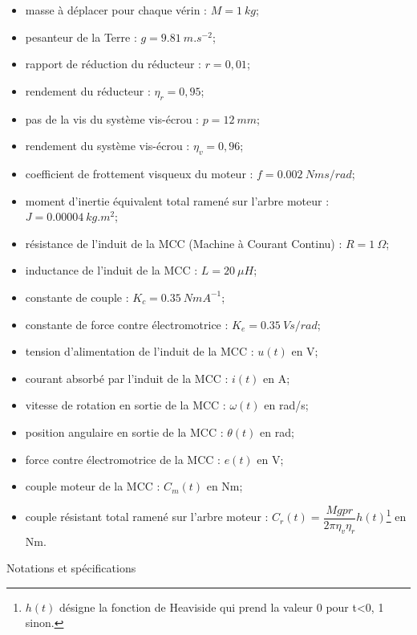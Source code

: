 \begin{table*}[!h]
\begin{multicols}{3}
\begin{itemize}
\item masse à déplacer pour chaque vérin : $M =\SI{1}{kg}$;
\item pesanteur de la Terre : $g = \SI{9,81}{m.s^{-2}}$;
\item rapport de réduction du réducteur : $r = 0,01$;
\item rendement du réducteur : $\eta_r = 0,95$;
\item pas de la vis du système vis-écrou : $p = \SI{12}{mm}$;
\item rendement du système vis-écrou : $\eta_v = 0,96$;
\item coefficient de frottement visqueux du moteur : $f=\SI{0,002}{Nms/rad}$;
\item moment d’inertie équivalent total ramené sur l’arbre moteur : $J = \SI{0,00004}{kg.m^2}$;
\item résistance de l’induit de la MCC (Machine à Courant Continu) : $R =\SI{1}{\Omega}$;
\item inductance de l’induit de la MCC : $L = \SI{20}{\mu H}$;
\item constante de couple : $K_c = \SI{0,35}{NmA^{-1}}$;
\item constante de force contre électromotrice : $K_e = \SI{0,35}{Vs/rad}$;
\item tension d’alimentation de l’induit de la MCC : $u(t)$ en \si{V};
\item courant absorbé par l’induit de la MCC : $i(t)$ en \si{A};
\item vitesse de rotation en sortie de la MCC : $\omega(t)$ en \si{rad/s};
\item position angulaire en sortie de la MCC :  $\theta(t)$ en \si{rad};
\item force contre électromotrice de la MCC : $e(t)$ en \si{V};
\item couple moteur de la MCC : $C_m(t)$ en \si{Nm};
\item couple résistant total ramené sur l’arbre moteur : $C_r(t) = \dfrac{Mgpr}{2\pi \eta_v \eta_r} h(t)$\footnote{$h(t)$ désigne la fonction de Heaviside qui prend la valeur 0 pour t<0, 1 sinon.} en \si{Nm}.
\end{itemize}
\end{multicols}
\caption{Notations et spécifications \label{tab_01}}
\end{table*}

